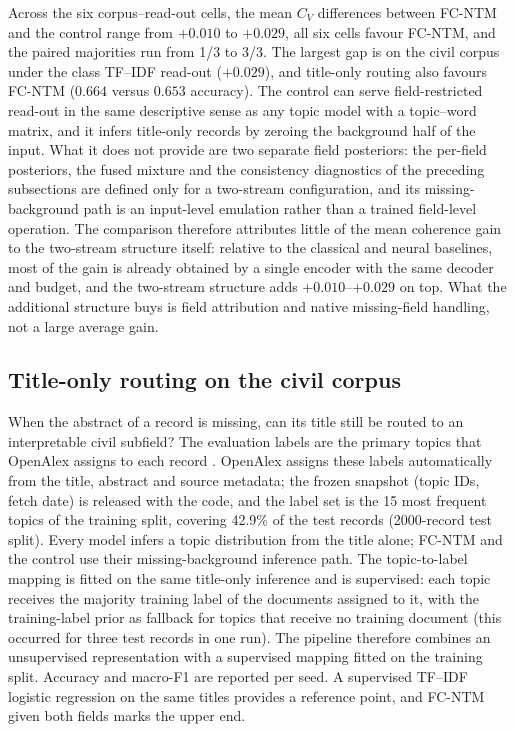 \documentclass[pdflatex,sn-basic]{sn-jnl}
\newcommand{\fcntm}{FC-NTM}
\begin{document}
Across the six corpus--read-out cells, the mean $C_V$ differences between \fcntm{} and the
control range from $+0.010$ to $+0.029$, all six cells favour \fcntm{}, and the paired
majorities run from 1/3 to 3/3. The largest gap is on the civil corpus under the class
TF--IDF read-out ($+0.029$), and title-only routing also favours \fcntm{} ($0.664$ versus
$0.653$ accuracy). The control can serve field-restricted read-out in the same descriptive
sense as any topic model with a topic--word matrix, and it infers title-only records by
zeroing the background half of the input. What it does not provide are two separate field
posteriors: the per-field posteriors, the fused mixture and the consistency diagnostics of
the preceding subsections are defined only for a two-stream configuration, and its
missing-background path is an input-level emulation rather than a trained field-level
operation. The comparison therefore attributes little of the mean coherence gain to the
two-stream structure itself: relative to the classical and neural baselines, most of the gain
is already obtained by a single encoder with the same decoder and budget, and the two-stream
structure adds $+0.010$--$+0.029$ on top. What the additional structure buys is field
attribution and native missing-field handling, not a large average gain.

\subsection{Title-only routing on the civil corpus}
When the abstract of a record is missing, can its title still be routed to an interpretable
civil subfield? The evaluation labels are the primary topics that OpenAlex assigns to each record
\cite{openalextopics2026}. OpenAlex assigns these labels automatically from the title, abstract
and source metadata; the frozen snapshot (topic IDs, fetch date) is released with the code, and
the label set is the 15 most frequent topics of the training split, covering 42.9\% of the test
records (2000-record test split). Every model infers a topic distribution from the title alone;
\fcntm{} and the control use their missing-background inference path. The topic-to-label mapping
is fitted on the same title-only inference and is supervised: each topic receives the majority
training label of the documents assigned to it, with the training-label prior as fallback for
topics that receive no training document (this occurred for three test records in one run). The
pipeline therefore combines an unsupervised representation with a supervised mapping fitted on
the training split.
Accuracy and macro-F1 are reported per seed. A supervised TF--IDF logistic regression on the same
titles provides a reference point, and \fcntm{} given both fields marks the upper end.
\end{document}

